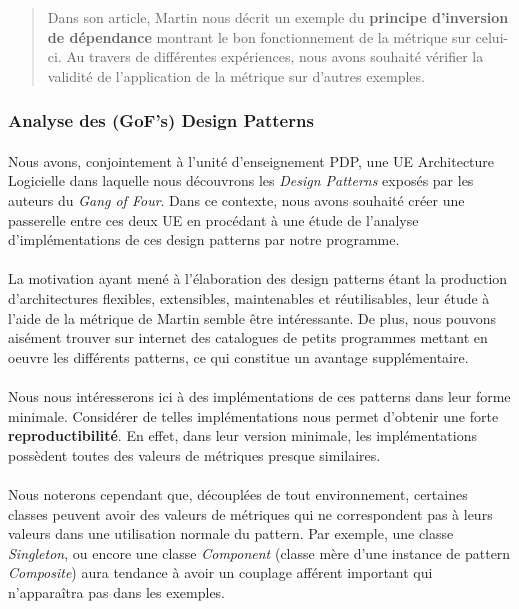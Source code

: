 \documentclass{scrartcl}
\begin{document}
    \begin{abstract}
        Dans son article, Martin nous décrit un exemple du \textbf{principe d'inversion de dépendance} montrant le bon fonctionnement de la métrique sur celui-ci. Au travers de différentes expériences, nous avons souhaité vérifier la validité de l'application de la métrique sur d'autres exemples.
    \end{abstract}

    \subsubsection{Analyse des (GoF's) Design Patterns}
    \paragraph{}Nous avons, conjointement à l'unité d'enseignement PDP, une UE \og Architecture Logicielle\fg{} dans laquelle nous découvrons les \emph{Design Patterns} exposés par les auteurs du \emph{Gang of Four}\cite{GoF:1994}. Dans ce contexte, nous avons souhaité créer une passerelle entre ces deux UE en procédant à une étude de l'analyse d'implémentations de ces design patterns par notre programme.

    \paragraph{}La motivation ayant mené à l'élaboration des design patterns étant la production d'architectures flexibles, extensibles, maintenables et réutilisables, leur étude à l'aide de la métrique de Martin semble être intéressante. De plus, nous pouvons aisément trouver sur internet des catalogues de petits programmes mettant en oeuvre les différents patterns, ce qui constitue un avantage supplémentaire. 

    \paragraph{}Nous nous intéresserons ici à des implémentations de ces patterns dans leur forme minimale. Considérer de telles implémentations nous permet d'obtenir une forte \textbf{reproductibilité}. En effet, dans leur version minimale, les implémentations possèdent toutes des valeurs de métriques presque similaires.

    \paragraph{}Nous noterons cependant que, découplées de tout environnement, certaines classes peuvent avoir des valeurs de métriques qui ne correspondent pas à leurs valeurs dans une utilisation normale du pattern. Par exemple, une classe \emph{Singleton}, ou encore une classe \emph{Component} (classe mère d'une instance de pattern \emph{Composite}) aura tendance à avoir un couplage afférent important qui n’apparaîtra pas dans les exemples.
    
\end{document}
